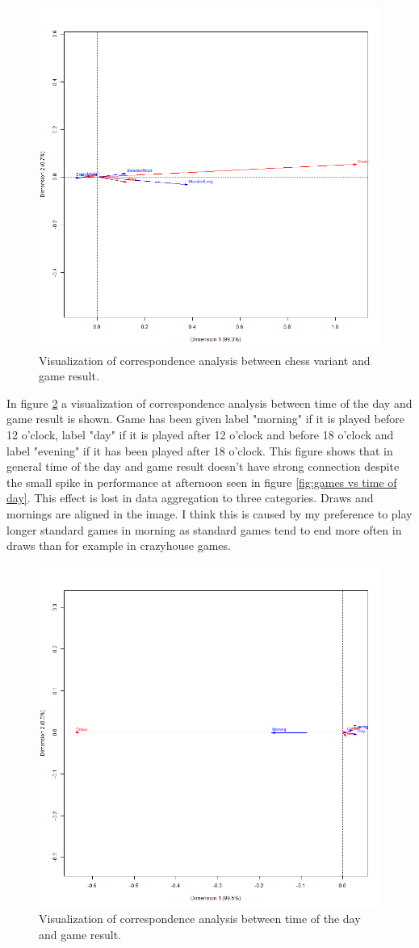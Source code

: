 \begin{figure}[ht!]
    \includegraphics[width=.7\textwidth]{../img/variant_and_result.png}
    \caption{Visualization of correspondence analysis between chess variant and game result.}
    \label{fig:variant vs result}
\end{figure}

In figure \ref{fig:time vs result} a visualization of correspondence analysis between time of the day and game result is shown. Game has been given label "morning" if it is played before 12 o'clock, label "day" if it is played after 12 o'clock and before 18 o'clock and label "evening" if it has been played after 18 o'clock. This figure shows that in general time of the day and game result doesn't have strong connection despite the small spike in performance at afternoon seen in figure \ref{fig:games vs time of day}. This effect is lost in data aggregation to three categories. Draws and mornings are aligned in the image. I think this is caused by my preference to play longer standard games in morning as standard games tend to end more often in draws than for example in crazyhouse games.

\begin{figure}[ht!]
    \includegraphics[width=.7\textwidth]{../img/time_and_result.png}
    \caption{Visualization of correspondence analysis between time of the day and game result.}
    \label{fig:time vs result}
\end{figure}